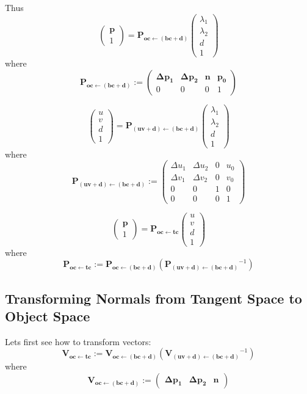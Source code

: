 \documentclass{article}
\newcommand{\vctr}[1]{\mathbf{#1}}
\newcommand{\point}[1]{\mathbf{#1}}
\newcommand{\mat}[1]{\mathbf{#1}}
\newcommand{\pMat}[2]{\mat{P_{#1 \leftarrow #2}}}
\newcommand{\vMat}[2]{\mat{V_{#1 \leftarrow #2}}}
\newcommand{\colvec}[1]{\begin{pmatrix}#1\end{pmatrix}}
\begin{document}
Thus
\[
 \colvec{\point{p}\\1} = \pMat{oc}{(bc+d)} \colvec{\lambda_1 \\ \lambda_2 \\ d \\ 1}
\]
where
\begin{equation}
\label{eq:mat_oc_from_bdc}
 \pMat{oc}{(bc+d)} := \begin{pmatrix} 
                  \point{\Delta p_1} & \point{\Delta p_2} & \vctr{n} & \point{p_0} \\
                  0 & 0 & 0 & 1
                 \end{pmatrix}
\end{equation}

\[
 \colvec{u \\ v \\ d \\1} = \pMat{(uv+d)}{(bc+d)} \colvec{\lambda_1 \\ \lambda_2 \\ d \\ 1}
\]
where
\begin{equation}
 \pMat{(uv+d)}{(bc+d)} := \begin{pmatrix} 
                  \Delta u_1 & \Delta u_2 & 0 & u_0 \\
                  \Delta v_1 & \Delta v_2 & 0 & v_0 \\
                  0 & 0 & 1 & 0 \\
                  0 & 0 & 0 & 1
                 \end{pmatrix}
\end{equation}

\begin{equation*}
\colvec{\point{p}\\1} = \pMat{oc}{tc} \colvec{u \\ v \\ d \\ 1} 
\end{equation*}
where
\begin{equation*}
 \pMat{oc}{tc} := \pMat{oc}{(bc+d)}(\pMat{(uv+d)}{(bc+d)}^{-1}) 
\end{equation*}

\subsection{Transforming Normals from Tangent Space to Object Space}

Lets first see how to transform vectors:
\begin{equation*}
 \vMat{oc}{tc} := \vMat{oc}{(bc+d)}(\vMat{(uv+d)}{(bc+d)}^{-1}) 
\end{equation*}
where
\begin{equation}
\label{eq:vmat_oc_from_bdc}
 \vMat{oc}{(bc+d)} := \begin{pmatrix} 
                  \point{\Delta p_1} & \point{\Delta p_2} & \vctr{n} 
                 \end{pmatrix}
\end{equation}
\end{document}

